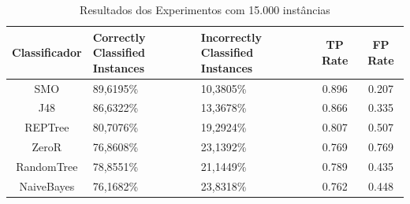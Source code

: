 \documentclass[
	12pt,				%
	openright,			%
	oneside,	
	a4paper,				%
	english,				%
	brazil				%
]{abntex2/abntex2} %
\begin{document}
		
\begin{table}[htbp]
	\centering
	\caption{Resultados dos Experimentos com 15.000 instâncias}
	\label{tabResultadosExperimentos15k}
	\begin{center}
		\renewcommand{\arraystretch}{2}
		\begin{tabular}{cp{3cm}p{3.2cm}cc}
			\hline
			\textbf{Classificador}                & \textbf{Correctly Classified Instances}               & \textbf{Incorrectly Classified Instances}      	& \textbf{TP Rate}						&\textbf{FP Rate}   \\ \hline
			SMO                                      & 89,6195\%                                                                                 & 10,3805\% 							&0.896									&0.207                                                                                    \\
			J48                                      & 86,6322\%                                                                                  & 13,3678\% 							&0.866										&0.335                                                                                     \\
			REPTree                                  & 80,7076\%                                                                                 & 19,2924\%								&0.807											&0.507                                                                                     \\ \hline \hline
			ZeroR                               & 76,8608\%                                                                                 & 23,1392\%								&0.769												&0.769                                                                                     \\
			RandomTree    									& 78,8551\%                                                 									& 21,1449\%								&0.789											&0.435                                                     								\\ 
			NaiveBayes                               & 76,1682\%                                                                                 &  23,8318\%									&0.762												&0.448                                                                                     \\ \hline
		\end{tabular}
	\end{center}
\end{table}		
\end{document}
